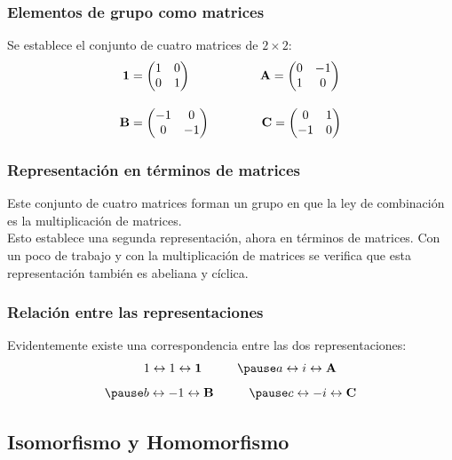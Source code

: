 \documentclass[12pt]{beamer}
\begin{document}
\begin{frame}
\frametitle{Elementos de grupo como matrices}
Se establece el conjunto de cuatro matrices de $2 \times 2$:
\pause
\begin{align}
\begin{aligned}
\vb{1} &= \mqty(
1 & 0 \\
0 & 1 ) \hspace{2cm} \vb{A} = \mqty(
0 & -1 \\
1 & 0 ) \\[1em]
\vb{B} &= \mqty(
-1 & 0 \\
0 & -1 ) \hspace{1.5cm} \vb{C} = \mqty(
0 & 1 \\
-1 & 0 )
\end{aligned}
\label{eq_ecuacion_04_184}
\end{align}
\end{frame}
\begin{frame}
\frametitle{Representación en términos de matrices}
Este conjunto de cuatro matrices forman un grupo en que la ley de combinación es la multiplicación de matrices.
\\
\bigskip
\pause
Esto establece una segunda representación, ahora en términos de matrices. \pause Con un poco de trabajo y con la multiplicación de matrices se verifica que esta representación también es abeliana y cíclica. 
\end{frame}
\begin{frame}
\frametitle{Relación entre las representaciones}
Evidentemente existe una correspondencia entre las dos representaciones:
\pause
\begin{eqnarray*}
&1 \leftrightarrow 1 \leftrightarrow \vb{1} \hspace{1cm}  \pause a \leftrightarrow i \leftrightarrow \vb{A} \\[0.5em] \pause
&b \leftrightarrow -1 \leftrightarrow \vb{B} \hspace{1cm} \pause c \leftrightarrow -i \leftrightarrow \vb{C}
\end{eqnarray*} 
\end{frame}

\subsection{Isomorfismo y Homomorfismo}
\end{document}
